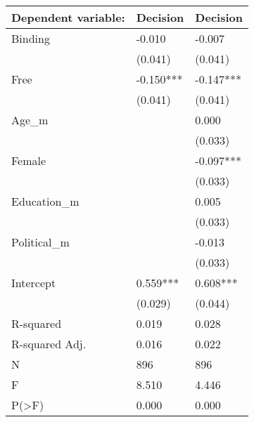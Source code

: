 \begin{tabular}{lll}
\toprule
Dependent variable: &   Decision &   Decision \\
\midrule
Binding        &     -0.010 &     -0.007 \\
               &    (0.041) &    (0.041) \\
Free           &  -0.150*** &  -0.147*** \\
               &    (0.041) &    (0.041) \\
Age\_m          &            &      0.000 \\
               &            &    (0.033) \\
Female         &            &  -0.097*** \\
               &            &    (0.033) \\
Education\_m    &            &      0.005 \\
               &            &    (0.033) \\
Political\_m    &            &     -0.013 \\
               &            &    (0.033) \\
Intercept      &   0.559*** &   0.608*** \\
               &    (0.029) &    (0.044) \\
R-squared      &      0.019 &      0.028 \\
R-squared Adj. &      0.016 &      0.022 \\
N              &        896 &        896 \\
F              &      8.510 &      4.446 \\
P(>F)          &      0.000 &      0.000 \\
\bottomrule
\end{tabular}
